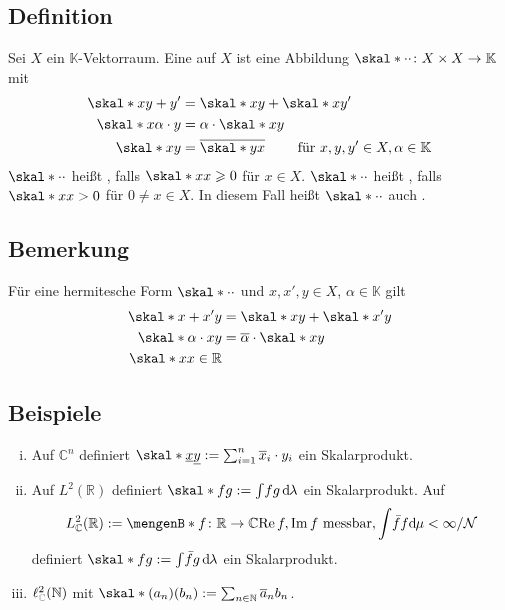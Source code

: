 \subsection[Definition: Hermitesche Form]{Definition} %
\label{sub:71}
Sei $X$ ein $\mathds{K}$-Vektorraum. Eine  auf $X$ ist eine Abbildung $\skal*{\cdot}{\cdot} \colon X \times X \to \mathds{K}$ mit
\begin{align*}
	\skal*{x}{y+y'} &= \skal*{x}{y} + \skal*{x}{y'} \\
	\skal*{x}{\alpha \cdot y} &= \alpha \cdot \skal*{x}{y} \\
	\skal*{x}{y} &= \overline{\skal*{y}{x}} \qquad \text{ für } x,y,y' \in X, \alpha \in \mathds{K}       
\end{align*}
$\skal*{\cdot}{\cdot } $ heißt , falls $\skal*{x}{x}\ge 0$ für $x \in X$.  $\skal*{\cdot }{\cdot } $ 
heißt , falls 
$\skal*{x}{x} >0$ für $0 \not= x \in X$. In diesem Fall heißt $\skal*{\cdot }{\cdot }$ auch .  

\subsection[Bemerkung: Einfache Eigenschaften von hermiteschen Formen]{Bemerkung} %
\label{sub:72}
Für eine hermitesche Form $\skal*{\cdot}{\cdot}$ und $x,x',y \in X$, $\alpha \in \mathds{K}$ gilt 
\begin{align*}
	\skal*{x+x'}{y} &= \skal*{x}{y} + \skal*{x'}{y} \\
	\skal*{\alpha \cdot x}{y} &= \overline{\alpha} \cdot \skal*{x}{y} \\
	\skal*{x}{x} \in \mathds{R} 
\end{align*}

\subsection[Beispiele für hermitesche Formen]{Beispiele} %
\label{sub:73}
\begin{enumerate}[(i)]
	\item Auf $\mathds{C}^n$ definiert $\skal*{\underline{x}}{\underline{y}} := \sum_{i=1}^{n} \overline{x}_i \cdot y_i$ ein Skalarprodukt.
	\item Auf $L^2(\mathds{R})$ definiert $\skal*{f}{g} := \int\! fg \,\mathd\lambda$ ein Skalarprodukt.
	Auf 
	\[
		L^2_\mathds{C}(\mathds{R}) := \set[f \colon \mathds{R} \to \mathds{C}]{\re f, \im f \text{ messbar}, \int \! \bar{f} f \mathd\mu < \infty } / \mathcal{N}
	\]
	definiert $\skal*{f}{g} := \int\! \bar{f} g \, \mathd\lambda$ ein Skalarprodukt.
	\item $\ell^2_{\color{gray}\mathds{C}}(\mathds{N})$ mit $\skal*{(a_n)}{(b_n)} := \sum_{n \in \mathds{N}} \overline{a}_n b_n$.
\end{enumerate}

